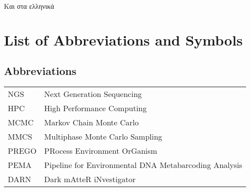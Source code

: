 \documentclass[master=elt,masteroption=eg]{kulemt}
\begin{document}
\begin{preface}
  
   
  
\end{preface}

\tableofcontents

\begin{abstract}


\end{abstract}


\begin{abstract*}

   Και στα ελληνικά
   
\end{abstract*}



\listoffiguresandtables


\chapter{List of Abbreviations and Symbols}

\section*{Abbreviations}
\begin{flushleft}
  \renewcommand{\arraystretch}{1.1}
  \begin{tabularx}{\textwidth}{@{}p{12mm}X@{}}
    NGS   & Next Generation Sequencing \\
    HPC   & High Performance Computing \\
    MCMC  & Markov Chain Monte Carlo \\
    MMCS  & Multiphase Monte Carlo Sampling \\
    PREGO & PRocess Environment OrGanism \\
    PEMA  & Pipeline for Environmental DNA Metabarcoding Analysis \\
    DARN  & Dark mAtteR iNvestigator \\
    
  \end{tabularx}
\end{flushleft}
\end{document}

